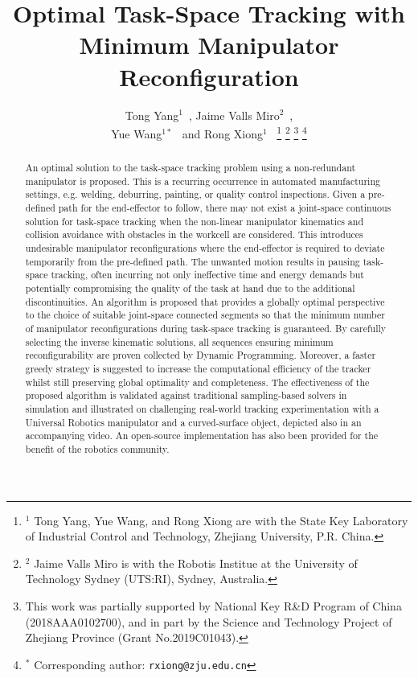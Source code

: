 \documentclass[letterpaper, 10 pt, conference]{ieeeconf}  %
\title{\LARGE \bf
Optimal Task-Space Tracking with Minimum Manipulator Reconfiguration
}
\author{Tong Yang$^{1}$~\IEEEmembership{Student Member,~IEEE}, Jaime Valls Miro$^2$~\IEEEmembership{Member,~IEEE}, \\Yue Wang$^{1*}$~\IEEEmembership{Member,~IEEE} and Rong Xiong$^1$~\IEEEmembership{Member,~IEEE}
\thanks{$^1$ Tong Yang, Yue Wang, and Rong Xiong are with the State Key 
Laboratory of Industrial Control and Technology, Zhejiang University, P.R. China. 
}
\thanks{$^2$ Jaime Valls Miro is with the Robotis Institue at the University of Technology Sydney (UTS:RI), Sydney, Australia.}
\thanks{This work was partially supported by National Key R\&D Program of China (2018AAA0102700), and in part by the Science and Technology Project of Zhejiang Province (Grant No.2019C01043).}
\thanks{$^*$ Corresponding author: {\tt\small rxiong@zju.edu.cn}}
}
\begin{document}
\maketitle
\thispagestyle{empty}
\pagestyle{empty}

\begin{abstract}
An optimal solution to the task-space tracking problem using a non-redundant manipulator is proposed. This is a recurring occurrence in automated manufacturing settings, 
e.g. welding, deburring, painting, or quality control inspections. 
Given a pre-defined path for the end-effector to follow, there may not exist a joint-space continuous solution for task-space tracking when the non-linear manipulator kinematics and collision avoidance with obstacles in the workcell are considered. This introduces undesirable manipulator reconfigurations where the end-effector is required to deviate temporarily from the pre-defined path. 
The unwanted motion results in pausing task-space tracking, often incurring not only ineffective time and energy demands but potentially compromising the quality of the task at hand due to the additional discontinuities. 
An algorithm is proposed that provides a globally optimal perspective to the choice of suitable joint-space connected segments so that the minimum number of manipulator reconfigurations during task-space tracking is guaranteed.  By carefully selecting the inverse kinematic solutions, all sequences ensuring minimum reconfigurability are proven collected by Dynamic Programming. 
Moreover, a faster greedy strategy is suggested to increase the computational efficiency of the tracker whilst still preserving global optimality and completeness. 
The effectiveness of the proposed algorithm is validated against traditional sampling-based solvers in simulation and illustrated on challenging real-world tracking experimentation with a Universal Robotics manipulator and a curved-surface object, depicted also in an accompanying video. 
An open-source implementation has also been provided for the benefit of the robotics community. 
\end{abstract}
\end{document}
